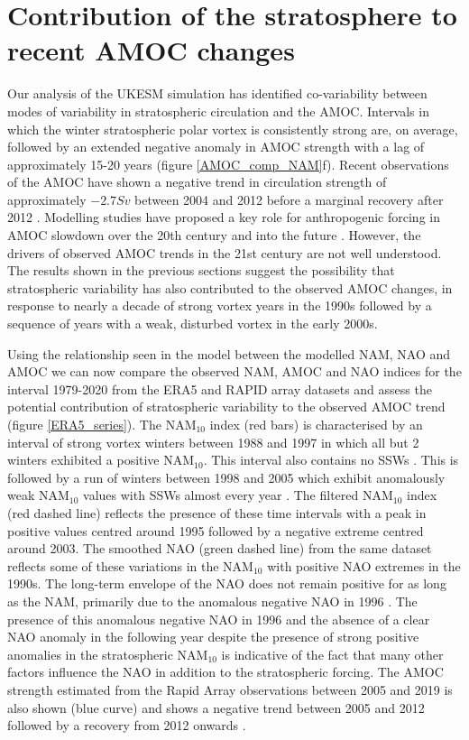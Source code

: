 \section{Contribution of the stratosphere to recent AMOC changes}
\label{sec:AMOC_obs_contribution}
Our analysis of the UKESM simulation has identified co-variability between modes of variability in stratospheric circulation and the AMOC. Intervals in which the winter stratospheric polar vortex is consistently strong are, on average, followed by an extended negative anomaly in AMOC strength with a lag of approximately 15-20 years (figure \ref{AMOC_comp_NAM}f). Recent observations of the AMOC have shown a negative trend in circulation strength of approximately $-2.7 Sv$ between 2004 and 2012 \citep{smeedNorth2018b} before a marginal recovery after 2012 \citep{smeedAtlantic2019c}. Modelling studies have proposed a key role for anthropogenic forcing in AMOC slowdown over the 20th century and into the future \citep{liuOverlooked2017a, bakkerFate2016b, liuMechanisms2019b}. However, the drivers of observed AMOC trends in the 21st century are not well understood. The results shown in the previous sections suggest the possibility that stratospheric variability has also contributed to the observed AMOC changes, in response to nearly a decade of strong vortex years in the 1990s followed by a sequence of years with a weak, disturbed vortex in the early 2000s. 

Using the relationship seen in the model between the modelled NAM, NAO and AMOC we can now compare the observed NAM, AMOC and NAO indices for the interval 1979-2020 from the ERA5 and RAPID array datasets and assess the potential contribution of stratospheric variability to the observed AMOC trend (figure \ref{ERA5_series}). The NAM$_{10}$ index (red bars) is characterised by an interval of strong vortex winters between 1988 and 1997 in which all but 2 winters exhibited a positive NAM$_{10}$. This interval also contains no SSWs \citep{pawsonCold1999b}. This is followed by a run of winters between 1998 and 2005 which exhibit anomalously weak NAM$_{10}$ values with SSWs almost every year  \cite{manneyRemarkable2005a}. The filtered NAM$_{10}$ index (red dashed line) reflects the presence of these time intervals with a peak in positive values centred around 1995 followed by a negative extreme centred around 2003. The smoothed NAO (green dashed line) from the same dataset reflects some of these variations in the NAM$_{10}$ with positive NAO extremes in the 1990s. The long-term envelope of the NAO does not remain positive for as long as the NAM, primarily due to the anomalous negative NAO in 1996 \citep{halpertClimate1997b}. The presence of this anomalous negative NAO in 1996 and the absence of a clear NAO anomaly in the following year despite the presence of strong positive anomalies in the stratospheric NAM$_{10}$ is indicative of the fact that many other factors influence the NAO in addition to the stratospheric forcing. The AMOC strength estimated from the Rapid Array observations between 2005 and 2019 is also shown (blue curve) and shows a negative trend between 2005 and 2012 followed by a recovery from 2012 onwards \citep{smeedNorth2018b, smeedAtlantic2019c}. 

